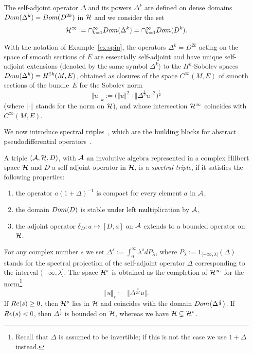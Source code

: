 \documentclass[11pt]{article}
\def \Ci {{C^\infty}}
\numberwithin{equation}{section}
\begin{document}
 The self-adjoint operator $\Delta$ and its powers $\Delta^k$ are def\/ined on
 dense  domains    $ {\rm
    Dom}(\Delta^k)={\rm
    Dom}(D^{2k})$ in ${\cal H}$ and we consider the set
    \[
    {\cal H}^\infty:= \cap_{k=1}^\infty {\rm
    Dom}(\Delta^k)=\cap_{k=1}^\infty {\rm
    Dom}(D^k).
    \]

\begin{example}
With the notation of Example~\ref{ex:spin},  the operators
$\Delta^k=D^{2k}$ acting on the space of smooth sections of $E$ are essentially self-adjoint and have  unique self-adjoint extensions (denoted by the same symbol $\Delta^k$) to the   $H^k$-Sobolev spaces
  ${\rm Dom}(\Delta^k)=H^{2k}(M, E)$, obtained as closures of the space
  $\Ci(M,E)$ of smooth sections of the bundle~$E$ for the Sobolev norm
\[
\Vert u\Vert_{k}:= \big(\Vert u\Vert^2+ \Vert \Delta^{\frac{k}{2}}  u\Vert^2\big)^{\frac{1}{2}}
 \]
 (where $\Vert\cdot\Vert$ stands for the norm
on ${\cal H}$), and whose intersection ${\cal H}^\infty$
  coincides with  $\Ci(M, E)$.
\end{example}


We now introduce spectral triples~\cite{Co}, which  are the building blocks for abstract pseudodif\/ferential operators~\cite{CoMo,Hig}.

\begin{definition} A triple   $({\cal A}, {\cal H}, D)$, with  ${\cal A}$  an
involutive algebra represented in a complex Hilbert space ${\cal H}$ and $D$ a
self-adjoint operator in ${\cal H}$, is a {\it spectral triple}, if it satisf\/ies the
following properties:{\samepage
\begin{enumerate}
\itemsep=-0.5pt
\item[1)] the operator $a  (1+\Delta)^{-1}$ is compact for every element $a$ in
  ${\cal A}$,
\item[2)] the domain ${\rm Dom}(D)$ is stable under left multiplication by
${\cal A}$,
\item[3)] the adjoint operator $\delta_D: a\mapsto [D, a]$ on ${\cal A}$  extends to a bounded operator on ${\cal H}$.
\end{enumerate}}
\end{definition}

 For any complex number $s$
we set $\Delta^s:= \int_0^\infty
 \lambda^s   dP_\lambda$, where $P_\lambda:= 1_{({-}\infty, \lambda]}(\Delta) $
 stands for the spectral projection
of  the self-adjoint operator $\Delta$ corresponding to the interval $({-}\infty,
\lambda]$. The space ${\cal H}^s$ is obtained as the completion of ${\cal H}^\infty$
 for the norm\footnote{Recall that $\Delta$ is assumed to be invertible; if this
 is not the case we use $1+\Delta$ instead.}
 \[
 \Vert u\Vert_s:=\Vert \Delta^{\frac{s}{2d}} u\Vert.
 \]
  If  ${\rm Re}(s)\geq 0$, then  ${\cal H}^s$ lies in $ {\cal H}$ and coincides with
   the domain $ {\rm
  Dom}\big(\Delta^{\frac{s}{2}}\big)$.   If  ${\rm Re}(s)< 0$, then
  $\Delta^{\frac{s}{2}}$ is bounded on ${\cal H}$, whereas we have
  $  {\cal H} \subsetneq {\cal H}^s$.
\end{document}
